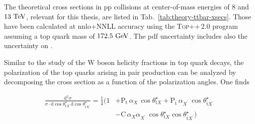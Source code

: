 The theoretical \ttbar cross sections in pp collisions at center-of-mass energies of $8$ and $13~\mathrm{TeV}$, relevant for this thesis, are listed in Tab.~\ref{tab:theory-ttbar-xsecs}. Those have been calculated at \gls{nnlo}+NNLL accuracy using the \textsc{Top++}\,2.0 program~\cite{Czakon:2011xx,Czakon:2013goa} assuming a top quark mass of $172.5~\mathrm{GeV}$. The \gls{pdf} uncertainty includes also the uncertainty on \as.


Similar to the study of the $\mathrm{W}$ boson helicity fractions in top quark decays, the polarization of the top quarks arising in pair production can be analyzed by decomposing the \ttbar cross section as a function of the polarization angles. One finds

\begin{align}
\frac{\mathrm{d}^{2}\sigma}{\sigma\cdot\mathrm{d}\cos\theta_{\mathrm{t}X}^\star~\mathrm{d}\cos\theta_{\bar{\mathrm{t}}X^\prime}^\star}=\frac{1}{4}\Big(1&+\mathrm{P}_\mathrm{t}\,\alpha_{X}\,\cos\theta_{\mathrm{t}X}^\star+\mathrm{P}_{\bar{\mathrm{t}}}\,\alpha_{X^\prime}\,\cos\theta_{\bar{\mathrm{t}}X^\prime}^\star \nonumber \\
&-\mathrm{C}\,\alpha_{X}\alpha_{X^\prime}\,\cos\theta_{\mathrm{t}X}^\star \cos\theta_{\bar{\mathrm{t}}X^\prime}^\star\Big) \label{eq:theory-ttbar-correlation}
\end{align}


